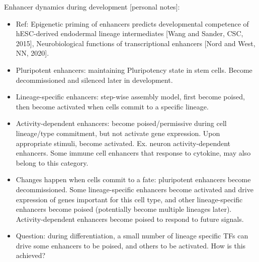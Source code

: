 \documentclass{report}
\begin{document}
Enhancer dynamics during development [personal notes]:
\begin{itemize}
	\item Ref: Epigenetic priming of enhancers predicts developmental competence of hESC-derived endodermal lineage intermediates [Wang and Sander, CSC, 2015], Neurobiological functions of transcriptional enhancers [Nord and West, NN, 2020].
	
	\item Pluripotent enhancers: maintaining Pluripotency state in stem cells. Become decommissioned and silenced later in development. 
	
	\item Lineage-specific enhancers: step-wise assembly model, first become poised, then become activated when cells commit to a specific lineage.
	
	\item Activity-dependent enhancers: become poised/permissive during cell lineage/type commitment, but not activate gene expression. Upon appropriate stimuli, become activated. Ex. neuron activity-dependent enhancers. Some immune cell enhancers that response to cytokine, may also belong to this category. 
	
	\item Changes happen when cells commit to a fate: pluripotent enhancers become decommissioned. Some lineage-specific enhancers become activated and drive expression of genes important for this cell type, and other lineage-specific enhancers become poised (potentially become multiple lineages later). Activity-dependent enhancers become poised to respond to future signals.
	
	\item Question: during differentiation, a small number of lineage specific TFs can drive some enhancers to be poised, and others to be activated. How is this achieved?  
\end{itemize}
\end{document}
